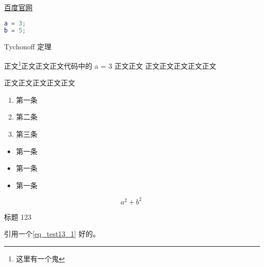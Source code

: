 

\begin{issues}
\issueDraft
\end{issues}

\href{http://www.baidu.com}{百度官网}


\begin{lstlisting}[language=matlab]
a = 3;
b = 5;
\end{lstlisting}

Tychonoff 定理 %

正文\footnote{这里有一个鬼}正文正文正文代码中的 a = 3 正文正文\cite{Cui1}
正文正文正文正文正文

正文正文正文正文正文

\begin{enumerate}
\item 第一条
\item 第二条
\item 第三条
\end{enumerate}

\begin{itemize}
\item 第一条
\item 第一条
\item 第一条
\end{itemize}


\begin{equation}\label{eq_test13_1}
a^2+b^2~
\end{equation}

\begin{example}{标题}
123
\end{example}

引用一个\autoref{eq_test13_1} 好的。
